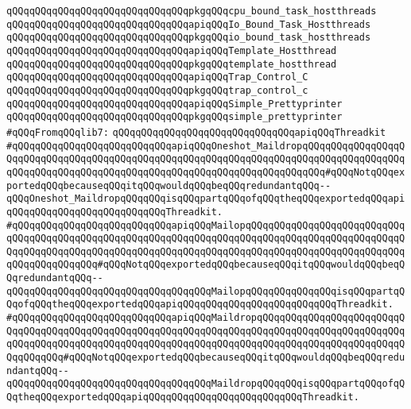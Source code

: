 \verb|qQQqqQQqqQQqqQQqqQQqqQQqqQQqqQQqpkgqQQqcpu_bound_task_hostthreads|\newline
\newline
\verb|qQQqqQQqqQQqqQQqqQQqqQQqqQQqqQQqapiqQQqIo_Bound_Task_Hostthreads|\newline
\verb|qQQqqQQqqQQqqQQqqQQqqQQqqQQqqQQqpkgqQQqio_bound_task_hostthreads|\newline
\newline
\verb|qQQqqQQqqQQqqQQqqQQqqQQqqQQqqQQqapiqQQqTemplate_Hostthread|\newline
\verb|qQQqqQQqqQQqqQQqqQQqqQQqqQQqqQQqpkgqQQqtemplate_hostthread|\newline
\newline
\verb|qQQqqQQqqQQqqQQqqQQqqQQqqQQqqQQqapiqQQqTrap_Control_C|\newline
\verb|qQQqqQQqqQQqqQQqqQQqqQQqqQQqqQQqpkgqQQqtrap_control_c|\newline
\newline
\verb|qQQqqQQqqQQqqQQqqQQqqQQqqQQqqQQqapiqQQqSimple_Prettyprinter|\newline
\verb|qQQqqQQqqQQqqQQqqQQqqQQqqQQqqQQqpkgqQQqsimple_prettyprinter|\newline
\newline
\verb|#qQQqFromqQQqlib7:|\newline
\verb|qQQqqQQqqQQqqQQqqQQqqQQqqQQqqQQqapiqQQqThreadkit|\newline
\verb|#qQQqqQQqqQQqqQQqqQQqqQQqqQQqapiqQQqOneshot_MaildropqQQqqQQqqQQqqQQqqQQqqQQqqQQqqQQqqQQqqQQqqQQqqQQqqQQqqQQqqQQqqQQqqQQqqQQqqQQqqQQqqQQqqQQqqQQqqQQqqQQqqQQqqQQqqQQqqQQqqQQqqQQqqQQqqQQqqQQqqQQqqQQq#qQQqNotqQQqexportedqQQqbecauseqQQqitqQQqwouldqQQqbeqQQqredundantqQQq--qQQqOneshot_MaildropqQQqqQQqisqQQqpartqQQqofqQQqtheqQQqexportedqQQqapiqQQqqQQqqQQqqQQqqQQqqQQqqQQqThreadkit.|\newline
\verb|#qQQqqQQqqQQqqQQqqQQqqQQqqQQqapiqQQqMailopqQQqqQQqqQQqqQQqqQQqqQQqqQQqqQQqqQQqqQQqqQQqqQQqqQQqqQQqqQQqqQQqqQQqqQQqqQQqqQQqqQQqqQQqqQQqqQQqqQQqqQQqqQQqqQQqqQQqqQQqqQQqqQQqqQQqqQQqqQQqqQQqqQQqqQQqqQQqqQQqqQQqqQQqqQQqqQQqqQQqqQQq#qQQqNotqQQqexportedqQQqbecauseqQQqitqQQqwouldqQQqbeqQQqredundantqQQq--qQQqqQQqqQQqqQQqqQQqqQQqqQQqqQQqqQQqMailopqQQqqQQqqQQqqQQqisqQQqpartqQQqofqQQqtheqQQqexportedqQQqapiqQQqqQQqqQQqqQQqqQQqqQQqqQQqThreadkit.|\newline
\verb|#qQQqqQQqqQQqqQQqqQQqqQQqqQQqapiqQQqMaildropqQQqqQQqqQQqqQQqqQQqqQQqqQQqqQQqqQQqqQQqqQQqqQQqqQQqqQQqqQQqqQQqqQQqqQQqqQQqqQQqqQQqqQQqqQQqqQQqqQQqqQQqqQQqqQQqqQQqqQQqqQQqqQQqqQQqqQQqqQQqqQQqqQQqqQQqqQQqqQQqqQQqqQQqqQQqqQQq#qQQqNotqQQqexportedqQQqbecauseqQQqitqQQqwouldqQQqbeqQQqredundantqQQq--qQQqqQQqqQQqqQQqqQQqqQQqqQQqqQQqqQQqMaildropqQQqqQQqisqQQqpartqQQqofqQQqtheqQQqexportedqQQqapiqQQqqQQqqQQqqQQqqQQqqQQqqQQqThreadkit.|\newline
